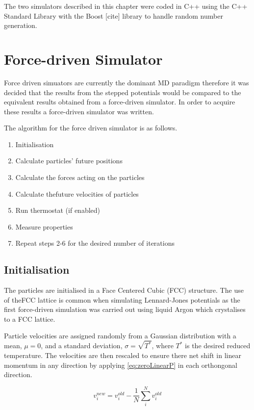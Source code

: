 \documentclass[12pt]{UoAthesis}
\begin{document}
The two simulators
described in this chapter were coded in C++ using the C++ Standard Library with
the Boost [cite] library to handle random number generation.
\section{Force-driven Simulator} Force driven simuators are currently the
dominant MD paradigm therefore it was decided that the results from the stepped
potentials would be compared to the equivalent results obtained from a
force-driven simulator. In order to acquire these results a force-driven
simulator was written.

The algorithm for the force driven simulator is as follows. \begin{flushleft}
\begin{enumerate} \item Initialisation \item Calculate particles' future
positions \item Calculate the forces acting on the particles \item Calculate
thefuture velocities of particles \item Run thermostat (if enabled) \item
Measure
properties \item Repeat steps 2-6 for the desired number of iterations
\end{enumerate} \end{flushleft}

\subsection{Initialisation} The particles are initialised in a Face Centered
Cubic (FCC)  structure. The use of
theFCC lattice is common when simulating Lennard-Jones potentials as the first
force-driven simulation \cite{Rahman1964} was carried out using liquid Argon
which crystalises to a FCC lattice.

Particle velocities are assigned randomly from a Gaussian distribution with a
mean, $\mu = 0$, and a standard deviation, $\sigma = \sqrt{T^{*}}$, where
$T^{*}$ is the desired reduced temperature. The velocities are then rescaled to
ensure there net shift in linear momentum in any direction by applying
\eqref{eq:zeroLinearP} in each orthongonal direction.

\begin{equation} v_{i}^{new} = v_{i}^{old} - \frac{1}{N}
\sum^{N}_{i}v_{i}^{old}\label{eq:zeroLinearP} \end{equation}
\end{document}
